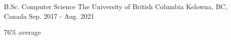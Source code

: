 

\begin{cventries}

  \cventry
    {B.Sc. Computer Science} %
    {The University of British Columbia} %
    {Kelowna, BC, Canada} %
    {Sep. 2017 - Aug. 2021} %
    {
      \begin{cvitems} %
        \item {76\%  average}
      \end{cvitems}
    }

\end{cventries}
